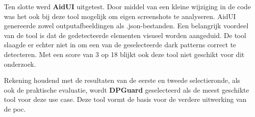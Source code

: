 \vspace{1em}

Ten slotte werd \textbf{AidUI} uitgetest. Door middel van een kleine wijziging in de code was het ook bij deze tool mogelijk om eigen screenshots te analyseren. AidUI genereerde zowel outputafbeeldingen als .json-bestanden. Een belangrijk voordeel van de tool is dat de gedetecteerde elementen visueel worden aangeduid. De tool slaagde er echter niet in om een van de geselecteerde dark patterns correct te detecteren. Met een score van 3 op 18 blijkt ook deze tool niet geschikt voor dit onderzoek.

\vspace{1em}

Rekening houdend met de resultaten van de eerste en tweede selectieronde, als ook de praktische evaluatie, wordt \textbf{DPGuard} geselecteerd als de meest geschikte tool voor deze use case. Deze tool vormt de basis voor de verdere uitwerking van de \acrshort{poc}.